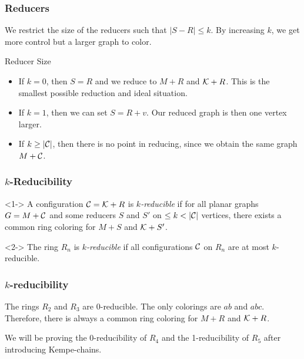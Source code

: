 \begin{frame}
    \frametitle{Reducers}
    We restrict the size of the reducers such that $|S-R| \leq k$. By increasing $k$, we get more control but a larger graph to color.
    \begin{block}{Reducer Size}
    \begin{itemize}
        \item If $k=0$, then $S=R$ and we reduce to $M+R$ and $\mathcal{K}+R$. This is the smallest possible reduction and ideal situation.
        \item If $k=1$, then we can set $S=R+v$. Our reduced graph is then one vertex larger.
        \item If $k \geq |\mathcal{C}|$, then there is no point in reducing, since we obtain the same graph $M+\mathcal{C}$.
    \end{itemize}
\end{block}
\end{frame}

\begin{frame}
    \frametitle{$k$-Reducibility}
    \begin{definition}<1->
        A configuration $\mathcal{C}=\mathcal{K}+R$ is \emph{$k$-reducible} if for all planar graphs $G=M+\mathcal{C}$ and some reducers $S$ and $S'$ on $\leq k < |\mathcal{C}|$ vertices, there exists a common ring coloring for $M+S$ and $\mathcal{K}+S'$.
    \end{definition}
    \begin{definition}<2->
        The ring $R_n$ is \emph{$k$-reducible} if all configurations $\mathcal{C}$ on $R_n$ are at most $k$-reducible.
    \end{definition}
\end{frame}

\begin{frame}
    \frametitle{$k$-reducibility}
    \begin{example}
        The rings $R_2$ and $R_3$ are 0-reducible. The only colorings are $ab$ and $abc$. Therefore, there is always a common ring coloring for $M+R$ and $\mathcal{K}+R$.
    \end{example}
    \vspace{1cm}
    We will be proving the 0-reducibility of $R_4$ and the 1-reducibility of $R_5$ after introducing Kempe-chains.
\end{frame}